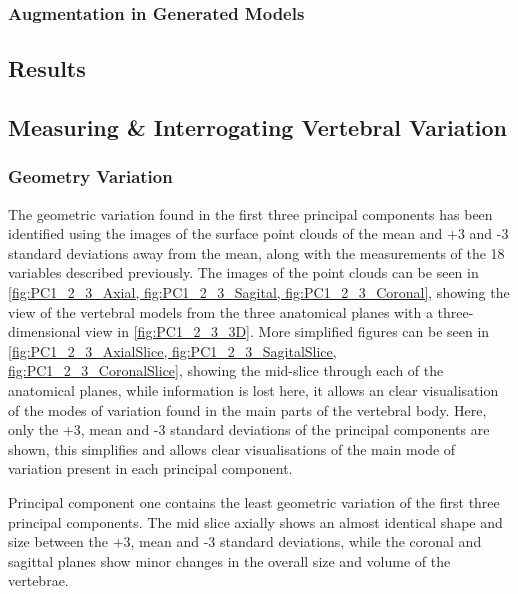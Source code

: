\subsubsection{Augmentation in Generated Models}




\subsection{Results}
\subsection{Measuring \& Interrogating Vertebral Variation}

\subsubsection{Geometry Variation}

The geometric variation found in the first three principal components has been identified using the images of the surface point clouds of the mean and +3 and -3 standard deviations away from the mean, along with the measurements of the 18 variables described previously.
The images of the point clouds can be seen in \cref{fig:PC1_2_3_Axial, fig:PC1_2_3_Sagital, fig:PC1_2_3_Coronal}, showing the view of the vertebral models from the three anatomical planes with a three-dimensional view in \cref{fig:PC1_2_3_3D}.
More simplified figures can be seen in \cref{fig:PC1_2_3_AxialSlice, fig:PC1_2_3_SagitalSlice, fig:PC1_2_3_CoronalSlice}, showing the mid-slice through each of the anatomical planes, while information is lost here, it allows an clear visualisation of the modes of variation found in the main parts of the vertebral body.
Here, only the +3, mean and -3 standard deviations of the principal components are shown, this simplifies and allows clear visualisations of the main mode of variation present in each principal component.

Principal component one contains the least geometric variation of the first three principal components.
The mid slice axially shows an almost identical shape and size between the +3, mean and -3 standard deviations, while the coronal and sagittal planes show minor changes in the overall size and volume of the vertebrae.

